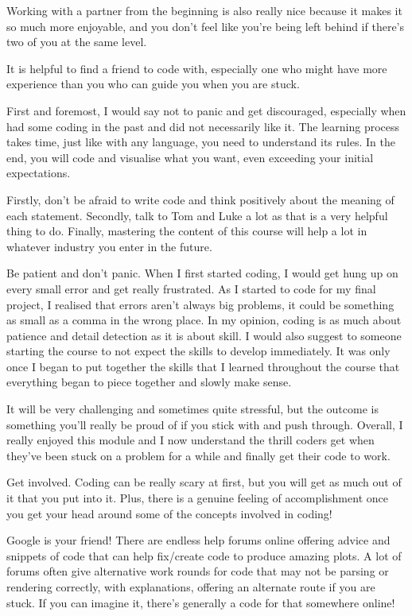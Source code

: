 \documentclass[
  12pt,
  a5paper,
]{book}
\begin{document}
Working with a partner from the beginning is also really nice because it makes it so much more enjoyable, and you don't feel like you're being left behind if there's two of you at the same level.

It is helpful to find a friend to code with, especially one who might have more experience than you who can guide you when you are stuck.

First and foremost, I would say not to panic and get discouraged, especially when had some coding in the past and did not necessarily like it. The learning process takes time, just like with any language, you need to understand its rules. In the end, you will code and visualise what you want, even exceeding your initial expectations.

Firstly, don't be afraid to write code and think positively about the meaning of each statement. Secondly, talk to Tom and Luke a lot as that is a very helpful thing to do. Finally, mastering the content of this course will help a lot in whatever industry you enter in the future.

Be patient and don't panic. When I first started coding, I would get hung up on every small error and get really frustrated. As I started to code for my final project, I realised that errors aren't always big problems, it could be something as small as a comma in the wrong place. In my opinion, coding is as much about patience and detail detection as it is about skill. I would also suggest to someone starting the course to not expect the skills to develop immediately. It was only once I began to put together the skills that I learned throughout the course that everything began to piece together and slowly make sense.

It will be very challenging and sometimes quite stressful, but the outcome is something you'll really be proud of if you stick with and push through. Overall, I really enjoyed this module and I now understand the thrill coders get when they've been stuck on a problem for a while and finally get their code to work.

Get involved. Coding can be really scary at first, but you will get as much out of it that you put into it. Plus, there is a genuine feeling of accomplishment once you get your head around some of the concepts involved in coding!

Google is your friend! There are endless help forums online offering advice and snippets of code that can help fix/create code to produce amazing plots. A lot of forums often give alternative work rounds for code that may not be parsing or rendering correctly, with explanations, offering an alternate route if you are stuck. If you can imagine it, there's generally a code for that somewhere online!
\end{document}
